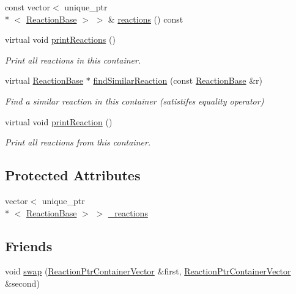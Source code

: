 \begin{DoxyCompactItemize}
const vector$<$ unique\+\_\+ptr\\*
$<$ \hyperlink{classReactionBase}{Reaction\+Base} $>$ $>$ \& \hyperlink{classReactionPtrContainerVector_a62e397a600813ffb5a29e7e238dd91d2}{reactions} () const 
\item 
virtual void \hyperlink{classReactionPtrContainerVector_a319196f208d6e5d52974339c11a7ecef}{print\+Reactions} ()
\begin{DoxyCompactList}\small\item\em Print all reactions in this container. \end{DoxyCompactList}\item 
virtual \hyperlink{classReactionBase}{Reaction\+Base} $\ast$ \hyperlink{classReactionPtrContainerVector_a1e6482eb0bd72d633c768208918855f8}{find\+Similar\+Reaction} (const \hyperlink{classReactionBase}{Reaction\+Base} \&r)
\begin{DoxyCompactList}\small\item\em Find a similar reaction in this container (satistifes equality operator) \end{DoxyCompactList}\item 
virtual void \hyperlink{classReactionPtrContainerIFace_a9a0ee050b8dec4b0fbac25dac87b7653}{print\+Reaction} ()
\begin{DoxyCompactList}\small\item\em Print all reactions from this container. \end{DoxyCompactList}\end{DoxyCompactItemize}
\subsection*{Protected Attributes}
\begin{DoxyCompactItemize}
\item 
vector$<$ unique\+\_\+ptr\\*
$<$ \hyperlink{classReactionBase}{Reaction\+Base} $>$ $>$ \hyperlink{classReactionPtrContainerVector_a21b0105a34e1240afb6d0783c965ddc6}{\+\_\+reactions}
\end{DoxyCompactItemize}
\subsection*{Friends}
\begin{DoxyCompactItemize}
\item 
void \hyperlink{classReactionPtrContainerVector_ae4230b7c32a5f731b8ec4bcb81c7351d}{swap} (\hyperlink{classReactionPtrContainerVector}{Reaction\+Ptr\+Container\+Vector} \&first, \hyperlink{classReactionPtrContainerVector}{Reaction\+Ptr\+Container\+Vector} \&second)
\end{DoxyCompactItemize}


